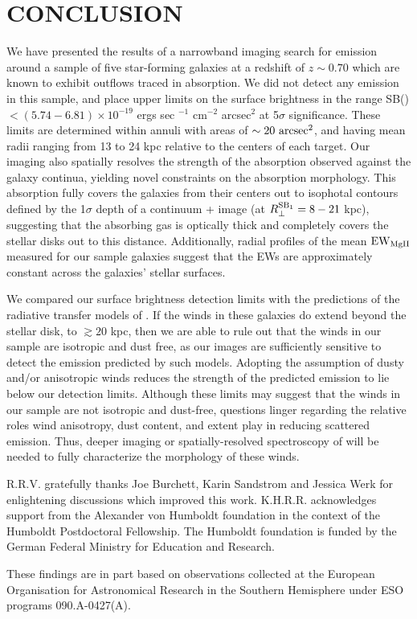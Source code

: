 \documentclass[trackchanges,twocolumn]{aastex62}
\begin{document}
\section{CONCLUSION}\label{sec:conclusion}
We have presented the results of a narrowband imaging search for  emission around a sample of five star-forming galaxies at a redshift of $z \sim 0.70$ which are known to exhibit outflows traced in  absorption. We did not detect any  emission in this sample, and place  upper limits on the surface brightness in the range SB() $< (5.74-6.81) \times 10^{-19}$ ergs sec $^{-1}$ cm$^{-2}$ arcsec$^2$ at 5$\sigma$ significance. These limits are determined within annuli with areas of $\sim 20~\rm arcsec^2$, and having mean radii ranging from 13 to 24 kpc relative to the centers of each target. Our imaging also spatially resolves the strength of the  absorption observed against the galaxy continua, yielding novel constraints on the  absorption morphology. 
This absorption fully covers the galaxies from their centers out to isophotal contours defined by the %
1$\sigma$ depth of a continuum +  image (at %
$R_{\perp}^{\rm SB_1} = 8-21$ kpc),
suggesting that the absorbing gas is optically thick and completely covers the stellar disks out to this distance. Additionally, radial profiles of the mean $\rm EW_{MgII}$ measured for our sample galaxies suggest that the EWs %
are approximately constant across the galaxies' stellar surfaces. 

We compared our surface brightness detection limits with the predictions of the radiative transfer models of \cite{Prochaska_2011}. If the winds in these galaxies do extend beyond the stellar disk, to $\gtrsim 20$ kpc, then we are able to rule out that the winds in our sample are isotropic and dust free, as our images are sufficiently sensitive to detect the emission predicted by such models. Adopting the assumption of dusty and/or anisotropic winds reduces the strength of the predicted  emission to lie below our detection limits. Although these limits may suggest that the winds in our sample are not isotropic and dust-free, questions linger regarding the relative roles wind anisotropy, dust content, and extent play in reducing scattered emission. Thus, deeper imaging or spatially-resolved spectroscopy of  will be needed to fully characterize the morphology of these winds. 

\acknowledgements
R.R.V. gratefully thanks Joe Burchett, Karin Sandstrom and Jessica Werk for enlightening discussions which improved this work.
K.H.R.R. acknowledges support from the Alexander von Humboldt foundation in the context of the Humboldt Postdoctoral Fellowship. The Humboldt foundation is funded by the German Federal Ministry for Education and Research.

These findings are in part based on observations collected at the
European Organisation for Astronomical Research in the Southern
Hemisphere under ESO programs 090.A-0427(A).

\newpage

\listofchanges
\end{document}
